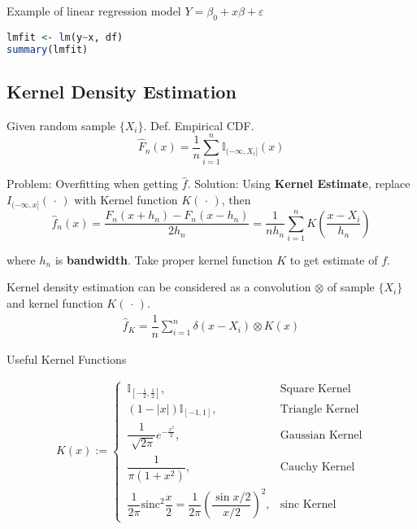 \begin{rcode}
    Example of linear regression model $ Y = \beta _0+x\beta +\varepsilon  $
\begin{lstlisting}[language=R]
lmfit <- lm(y~x, df)
summary(lmfit)
\end{lstlisting}
\end{rcode}

    

\subsection{Kernel Density Estimation}\label{SubSectionKernelDensityEstimation}
    Given random sample $\{X_i\}$. Def. Empirical CDF.
    \begin{equation}\label{empiricaldisreibutionfunction}
        \hat{F}_n(x)=\frac{1}{n}\sum_{i=1}^n\mathbb{I}_{(-\infty,X_i]}(x) 
    \end{equation}
        

    Problem: Overfitting when getting $\hat{f}$. Solution: Using \textbf{Kernel Estimate}, replace $I_{(-\infty,x]}(\,\cdot\,)$ with Kernel function $K(\,\cdot\,)$, then
    \begin{equation}
        \hat{f}_n(x)=\dfrac{F_n(x+h_n)-F_n(x-h_n)}{2h_n}=\frac{1}{nh_n}\sum_{i=1}^nK(\frac{x-X_i}{h_n})
    \end{equation}

    where $h_n$ is \textbf{bandwidth}. Take proper kernel function $K$ to get estimate of $f$.

    Kernel density estimation can be considered as a convolution $ \otimes $ of sample $\{X_i\}$ and kernel function $K(\, \cdot \, )$.
    \begin{align}
        \hat{f}_K= \dfrac{1}{n}\sum_{i=1}^n\delta (x-X_i) \otimes K(x)
    \end{align}
    
    

\begin{point}
        Useful Kernel Functions
\end{point}

    
    \begin{align}
        K(x):=\begin{cases}
            \,\mathbb{I}_{[-\frac{1}{2},\frac{1}{2}]},&\text{Square Kernel}\\
            \,(1-|x|)\mathbb{I}_{[-1,1]},&\text{Triangle Kernel}\\
            \,\dfrac{1}{\sqrt[]{2\pi}}e^{-\frac{x^2}{2}},&\text{Gaussian Kernel}\\
            \,\dfrac{1}{\pi(1+x^2)},&\text{Cauchy Kernel}\\
            \,\dfrac{1}{2\pi}\mathrm{sinc}^2\dfrac{x}{2}=\dfrac{1}{2\pi}\left(\dfrac{\sin x/2}{x/2}\right)^2,&\text{sinc Kernel}
        \end{cases} 
    \end{align}
    

